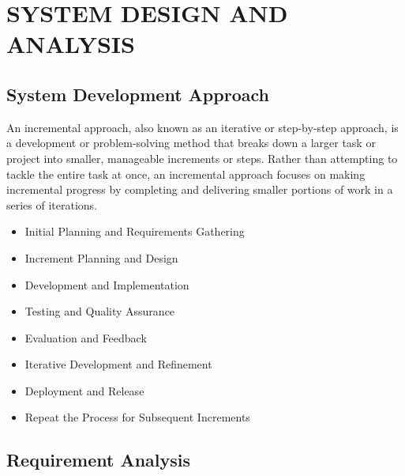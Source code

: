 \chapter{SYSTEM DESIGN AND ANALYSIS}
\section{System Development Approach}
An incremental approach, also known as an iterative or step-by-step approach, is a development or problem-solving method that breaks down a larger task or project into smaller, manageable increments or steps. Rather than attempting to tackle the entire task at once, an incremental approach focuses on making incremental progress by completing and delivering smaller portions of work in a series of iterations.
\begin{itemize}
    \setlength\itemsep{0.25em}
    \item Initial Planning and Requirements Gathering
    \item Increment Planning and Design
    \item Development and Implementation
    \item Testing and Quality Assurance
    \item Evaluation and Feedback
    \item Iterative Development and Refinement
    \item Deployment and Release
    \item Repeat the Process for Subsequent Increments
\end{itemize}
\section{Requirement Analysis}
